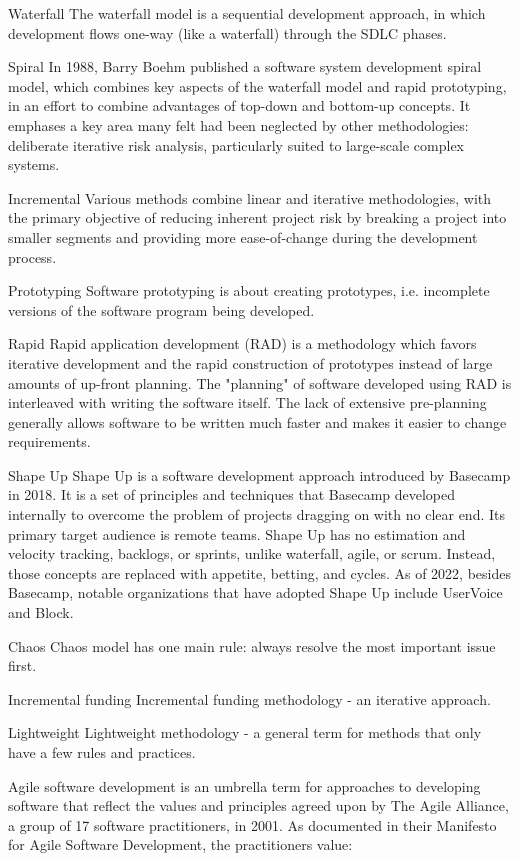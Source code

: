Waterfall
The waterfall model is a sequential development approach, in which development flows one-way (like a waterfall) through the SDLC phases.

Spiral
In 1988, Barry Boehm published a software system development spiral model, which combines key aspects of the waterfall model and  rapid prototyping, in an effort to combine advantages of  top-down and bottom-up concepts. It emphases a key area many felt had been neglected by other methodologies: deliberate iterative risk analysis, particularly suited to large-scale complex systems.

Incremental
Various methods combine linear and iterative methodologies, with the primary objective of reducing inherent project risk by breaking a project into smaller segments and providing more ease-of-change during the development process.

Prototyping
Software prototyping is about creating prototypes, i.e. incomplete versions of the software program being developed.

Rapid
Rapid application development (RAD) is a methodology which favors iterative development and the rapid construction of prototypes instead of large amounts of up-front planning. The "planning" of software developed using RAD is interleaved with writing the software itself. The lack of extensive pre-planning generally allows software to be written much faster and makes it easier to change requirements.

Shape Up
Shape Up is a software development approach introduced by Basecamp in 2018. It is a set of principles and techniques that Basecamp developed internally to overcome the problem of projects dragging on with no clear end. Its primary target audience is remote teams. Shape Up has no estimation and velocity tracking, backlogs, or sprints, unlike waterfall, agile, or scrum. Instead, those concepts are replaced with appetite, betting, and cycles. As of 2022, besides Basecamp, notable organizations that have adopted Shape Up include UserVoice and Block.

Chaos
Chaos model has one main rule: always resolve the most important issue first.

Incremental funding
Incremental funding methodology - an iterative approach.

Lightweight
Lightweight methodology - a general term for methods that only have a few rules and practices.

Agile software development is an umbrella term for approaches to developing software that reflect the values and principles agreed upon by The Agile Alliance, a group of 17 software practitioners, in 2001. As documented in their Manifesto for Agile Software Development, the practitioners value: 

